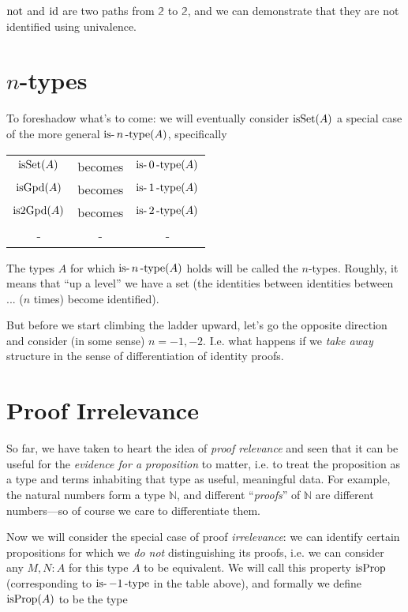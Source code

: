 \documentclass[11pt]{article}
\begin{document}
$\operatorname{not}$ and $\operatorname{id}$ are two paths from $\mathbb{2}$ to $\mathbb{2}$,
and we can demonstrate that they are not identified using univalence.


\section{$n$-types}

To foreshadow what's to come: we will eventually consider $\operatorname{isSet}(A)$ a
special case of the more general $\operatorname{is-}n\operatorname{-type}(A)$, specifically

\newcommand{\isntype}[1]{\op{is-}{#1}\op{-type}}

\begin{tabular}{ccc}
$\operatorname{isSet}(A)$ & becomes & $\isntype{0}(A)$ \\
$\operatorname{isGpd}(A)$ & becomes & $\isntype{1}(A)$ \\
$\operatorname{is2Gpd}(A)$ & becomes & $\isntype{2}(A)$ \\
- & - & -
\end{tabular}

The types $A$ for which $\operatorname{is-}n\operatorname{-type}(A)$ holds will be called the
$n$-types. Roughly, it means that ``up a level'' we have a set (the
identities between identities between ... ($n$ times) become identified).

But before we start climbing the ladder upward, let's go the opposite
direction and consider (in some sense) $n=-1, -2$. I.e. what happens if we
{\em take away} structure in the sense of differentiation of identity
proofs.

\section{Proof Irrelevance}

So far, we have taken to heart the idea of {\em proof relevance} and seen
that it can be useful for the {\em evidence for a proposition} to matter,
i.e. to treat the proposition as a type and terms inhabiting that type as
useful, meaningful data. For example, the natural numbers form a type
$\mathbb{N}$, and different ``{\em proofs}'' of $\mathbb{N}$ are different
numbers---so of course we care to differentiate them.

Now we will consider the special case of proof {\em irrelevance}: we can
identify certain propositions for which we {\em do not}
distinguishing its proofs, i.e. we can consider any $M, N : A$ for this type
$A$ to be equivalent. We will call this property $\operatorname{isProp}$
(corresponding to $\operatorname{is-}-1\operatorname{-type}$ in the table above), and formally
we define $\operatorname{isProp}(A)$ to be the type
\end{document}
